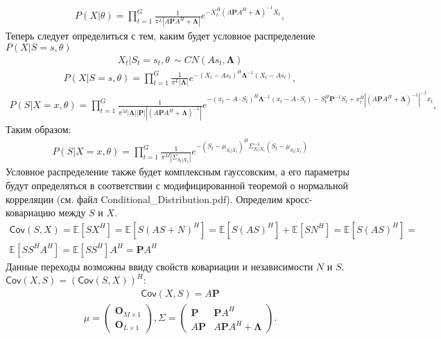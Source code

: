 \documentclass[11pt]{article}
\newcommand{\Expect}{\mathbb{E}}
\newcommand{\Cov}{\mathsf{Cov}}
\begin{document}
\begin{gather}
P(X|\theta) = \prod_{t=1}^G \frac{1}{\pi^L |A\mathbf{P}  A^H + \mathbf{\Lambda}|}e^{-X_t^H (A\mathbf{P} A^H + \mathbf{\Lambda})^{-1}X_t},
\end{gather}
Теперь следует определиться с тем, каким будет условное распределение $P(X|S=s, \theta)$
\begin{gather*}
X_t|S_t=s_t, \theta \, \sim CN(A s_t, \mathbf{\Lambda})
\end{gather*}
\begin{gather}
P(X|S=s,\theta) = \prod_{t=1}^G \frac{1}{\pi^L |\mathbf{\Lambda}|}e^{-(X_t-A s_t)^H \mathbf{\Lambda}^{-1}(X_t-A s_t)},
\end{gather}
\begin{gather}
P(S|X=x,\theta) = \prod_{t=1}^G \frac{1}{\pi^M |\mathbf{\Lambda}||\mathbf{P}||(A\mathbf{P} A^H + \mathbf{\Lambda})^{-1}|}e^{-(x_t-A\cdot S_t)^H \mathbf{\Lambda}^{-1}(x_t-A\cdot S_t)-S_t^H\mathbf{P}^{-1}S_t+x_t^H |(A\mathbf{P} A^H + \mathbf{\Lambda})^{-1}|^{-1}x_t},
\end{gather}
Таким образом:
\begin{gather}
P(S|X=x,\theta) = \prod_{t=1}^G \frac{1}{\pi^M |\Sigma_{S_t|X_t}|}e^{-(S_t-\mu_{S_t|X_t})^H \Sigma_{S_t|X_t}^{-1} (S_t-\mu_{S_t|X_t})}
\end{gather}
Условное распределение также будет комплексным гауссовским, а его параметры будут определяться в соответствии с модифицированной теоремой о нормальной корреляции (см. файл Conditional\_Distribution.pdf).
Определим кросс-ковариацию между $S$ и $X$.
\begin{equation}
\begin{gathered}
\Cov(S,X)=\Expect[SX^H]=\Expect[S(AS+N)^H]=\Expect[S(AS)^H]+\Expect[SN^H]=\Expect[S(AS)^H]=\\\Expect[SS^HA^H]=\Expect[SS^H]A^H=\mathbf{P}A^H
\end{gathered}
\end{equation}
Данные переходы возможны ввиду свойств ковариации и независимости $N$ и $S$. $\Cov(X,S)=(\Cov(S,X))^H$:
\begin{gather}
\Cov(X,S) = A\mathbf{P}
\end{gather}
\begin{gather}
\mu = \begin{pmatrix}
\mathbf{O}_{M\times1}\\
\mathbf{O}_{L\times1}
\end{pmatrix},
\Sigma = \begin{pmatrix}
\mathbf{P}&\mathbf{P}A^H\\
A\mathbf{P}&A\mathbf{P}A^H+\mathbf{\Lambda}
\end{pmatrix}.
\end{gather}
\end{document}
